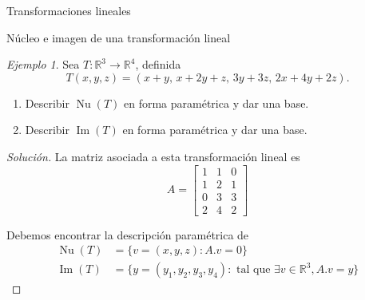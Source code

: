 \documentclass[a4paper,12pt,twoside,spanish,reqno]{amsbook}
\numberwithin{equation}{section}
\theoremstyle{definition}
\theoremstyle{remark}
\newtheorem*{ejemplo*}{Ejemplo}
\newcommand{\img}{\operatorname{Im}}
\newcommand{\nuc}{\operatorname{Nu}}
\newcommand{\R}{\mathbb R}
\begin{document}
\begin{chapter}{Transformaciones lineales}
\begin{section}{Núcleo e imagen de una transformación lineal}
        
\begin{ejemplo*}
        Sea $T: \R^3 \to \R^4$, definida
        $$
        T(x,y,z) = (x +y ,\,x +2y +z,\,3y +3z,\,2x +4y +2z).
        $$
        \begin{enumerate}
            \item Describir $\nuc(T)$  en forma paramétrica y dar una base.
            \item Describir $\img(T)$  en forma paramétrica y  dar una base. 
        \end{enumerate}
        \end{ejemplo*}
\begin{proof}[Solución]
    La matriz asociada a esta transformación lineal  es 
    \begin{equation*}
        A = \begin{bmatrix}
        1&1&0\\1&2&1\\0&3&3\\2&4&2
        \end{bmatrix}
    \end{equation*}

    Debemos encontrar la descripción paramétrica de
    \begin{align*}
        \nuc(T) &= \{v=(x,y,z):   A.{v}=0\}\\
        \img(T) &= \{y= (y_1,y_2,y_3,y_4): \text{ tal que } \exists v \in \R^3, A.{v} = {y}  \}
        \end{align*}


\end{proof}
\end{section}
\end{chapter}
\end{document}
